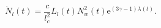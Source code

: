 \begin{equation}
\dot  N_l(t)
   =  \frac{c}{l^2_c} L_l(t) N^2_w(t) \mathrm{e}^{(3\gamma-1)\lambda(t)}.
\label{eq:loop_energy_rate}
\end{equation}

